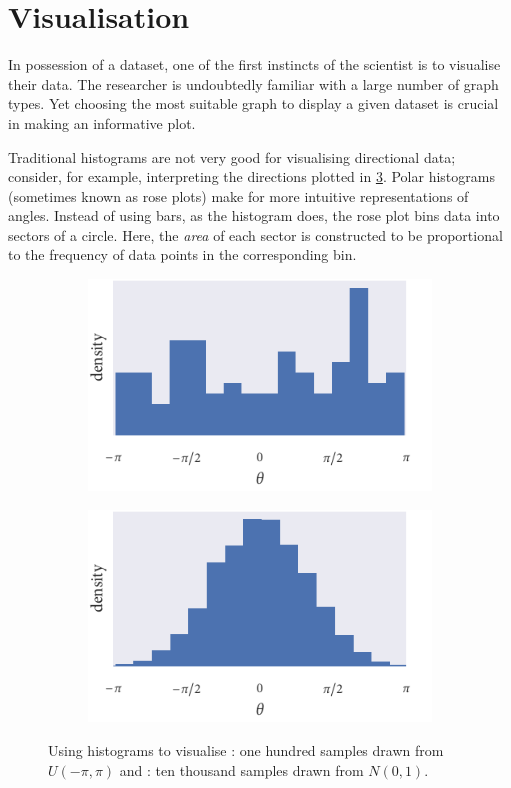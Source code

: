 \section{Visualisation}
\label{sec:circular_visualisation}

In possession of a dataset, one of the first instincts of the scientist is to visualise
their data. The researcher is undoubtedly familiar with a large number of graph types.
Yet choosing the most suitable graph to display a given dataset is crucial in making an
informative plot.

Traditional histograms are not very good for visualising directional data; consider, for
example, interpreting the directions plotted in \cref{fig:angle_hist}. Polar histograms
(sometimes known as rose plots) make for more intuitive representations of angles.
Instead of using bars, as the histogram does, the rose plot bins data into sectors of a
circle. Here, the \emph{area} of each sector is constructed to be proportional to the
frequency of data points in the corresponding bin.

\begin{figure}[tb]
	\begin{subfigure}[b]{0.5\textwidth}
		\includegraphics{unif_angle_hist.pdf}
		\caption{}
		\label{subfig:unif_angle_hist}
	\end{subfigure}%
	\begin{subfigure}[b]{0.5\textwidth}
		\includegraphics{norm_angle_hist.pdf}
		\caption{}
		\label{subfig:norm_angle_hist}
	\end{subfigure}
    \caption{Using histograms to visualise : one hundred
    samples drawn from $U(-\pi, \pi)$ and : ten thousand
    samples drawn from $N(0, 1)$.}
	\label{fig:angle_hist}
\end{figure}

